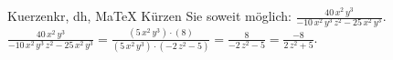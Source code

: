 \begin{MAufgabe}{Kuerzen}{kr, dh, MaTeX}
K\"urzen Sie soweit m\"oglich: $\frac{40\, x^2\, y^3}{ - 10\, x^2\, y^3\, z^2 - 25\, x^2\, y^3}$.\\ 
\ifLsg\MLoesung
\quad $\frac{40\, x^2\, y^3}{ - 10\, x^2\, y^3\, z^2 - 25\, x^2\, y^3}=\frac{(5\, x^2\, y^3)\cdot(8)}{(5\, x^2\, y^3)\cdot( - 2\, z^2 - 5)}=\frac{8}{ - 2\, z^2 - 5}=\frac{-8}{2\, z^2 + 5}$.\else\relax\fi
 \end{MAufgabe}